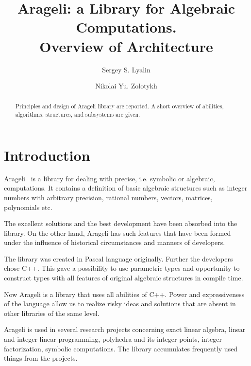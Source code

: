 \documentclass{llncs}
\begin{document}
\title{Arageli: a Library for Algebraic Computations.\\ Overview of Architecture}

\author{Sergey S. Lyalin \and Nikolai Yu. Zolotykh}




\maketitle


\begin{abstract}
Principles and design of Arageli library are reported.
A short overview of abilities, algorithms, structures, and subsystems are given.
\end{abstract}


\section{Introduction}

Arageli~\cite{Arageli} is a library for dealing with precise, i.e. symbolic or algebraic, computations. It contains a definition of basic algebraic structures such as integer numbers with arbitrary precision, rational numbers, vectors, matrices, polynomials etc.

The excellent solutions and the best development have been absorbed into the library. On the other hand, Arageli has such features that have been formed under the influence of historical circumstances and manners of developers.

The library was created in Pascal language originally. Further the developers chose C++. This gave a possibility to use parametric types and opportunity to construct types with all features of original algebraic structures in compile time.

Now Arageli is a library that uses all abilities of C++.  Power and expressiveness of the language allow us to realize risky ideas and solutions that are absent in other libraries of the same level.

Arageli is used in several research projects concerning exact linear algebra, linear and integer linear programming, polyhedra and its integer points, integer factorization, symbolic computations. The library accumulates frequently used things from the projects.
\end{document}
